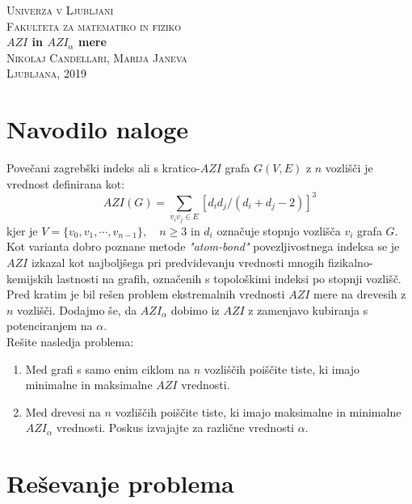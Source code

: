 \documentclass[12pt,a4paper]{amsart}
\begin{document}
\begin{titlepage}
	\begin{center}
	\textsc{Univerza v Ljubljani\\
		Fakulteta za matematiko in fiziko}\\
	[7cm]
	\huge{\bfseries $AZI$ in $AZI_{\alpha}$ mere} \\
	\textsc{\normalsize{Nikolaj Candellari, Marija Janeva}}\\
	[12,5cm]
	\textsc{\large Ljubljana, 2019}
	\end{center}
\end{titlepage}

\begin{flushleft}

\section{\textbf{Navodilo naloge}}

Povečani zagrebški indeks ali s kratico-$AZI$ grafa $G(V, E)$ z $n$ vozlišči je vrednost definirana kot:\\
\[ AZI(G) = \sum_{v_{i}v_{j} \in E}[d_id_j/(d_i+d_j-2)]^3\]
kjer je $V= \{v_0, v_1, \cdots, v_{n-1} \}, \quad n \ge 3$ in $d_i$ označuje stopnjo vozlišča $v_i$ grafa $G$. Kot varianta dobro poznane metode \textit{"atom-bond"} povezljivostnega indeksa se je $AZI$ izkazal kot najboljšega pri predvidevanju vrednosti mnogih fizikalno-kemijskih lastnosti na grafih, označenih s topološkimi indeksi po stopnji vozlišč. Pred kratim je bil rešen problem ekstremalnih vrednosti $AZI$ mere na drevesih z $n$ vozlišči. Dodajmo še, da $AZI_{\alpha}$ dobimo iz $AZI$ z zamenjavo kubiranja s potenciranjem na $\alpha$.\\
Rešite nasledja problema: \\

\begin{enumerate}
\item{Med grafi s samo enim ciklom na $n$ vozliščih poiščite tiste, ki imajo minimalne in maksimalne $AZI$ vrednosti.}

\item{Med drevesi na $n$ vozliščih poiščite tiste, ki imajo maksimalne in minimalne $AZI_{\alpha}$ vrednosti. Poskus izvajajte za različne vrednosti $\alpha$.}
\end{enumerate} 

\section{\textbf{Reševanje problema}}

\end{flushleft}
\end{document}
